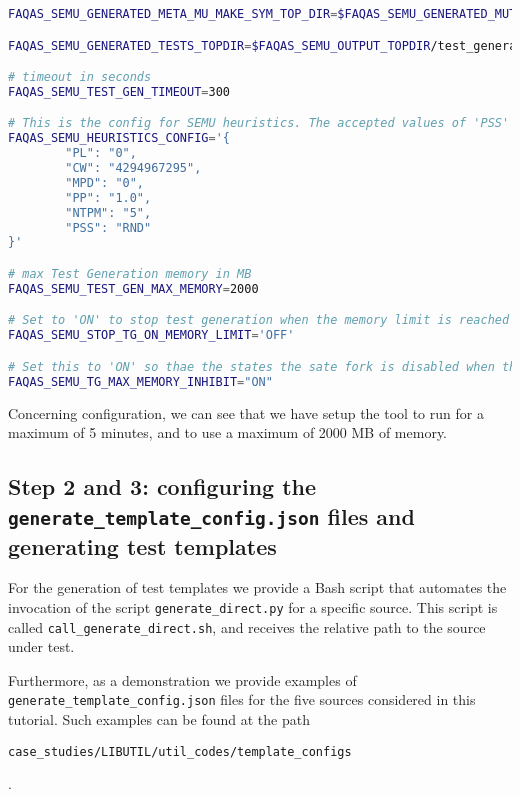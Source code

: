 \begin{lstlisting}[language=bash,label=listing:LIBUTIL:conf,caption=faqas\_semus\_conf.sh file for LIBUTIL case study.]
FAQAS_SEMU_GENERATED_META_MU_MAKE_SYM_TOP_DIR=$FAQAS_SEMU_GENERATED_MUTANTS_TOPDIR/"MakeSym-TestGen-Input"

FAQAS_SEMU_GENERATED_TESTS_TOPDIR=$FAQAS_SEMU_OUTPUT_TOPDIR/test_generation

# timeout in seconds
FAQAS_SEMU_TEST_GEN_TIMEOUT=300

# This is the config for SEMU heuristics. The accepted values of 'PSS' are 'RND' for random and 'MDO' for minimum distance to output
FAQAS_SEMU_HEURISTICS_CONFIG='{
        "PL": "0",
        "CW": "4294967295",
        "MPD": "0",
        "PP": "1.0",
        "NTPM": "5",
        "PSS": "RND"
}'

# max Test Generation memory in MB
FAQAS_SEMU_TEST_GEN_MAX_MEMORY=2000

# Set to 'ON' to stop test generation when the memory limit is reached
FAQAS_SEMU_STOP_TG_ON_MEMORY_LIMIT='OFF'

# Set this to 'ON' so thae the states the sate fork is disabled when the memory limit is reached, to avoid going much over it
FAQAS_SEMU_TG_MAX_MEMORY_INHIBIT="ON"
\end{lstlisting}

Concerning \SEMU configuration, we can see that we have setup the tool to run for a maximum of 5 minutes, and to use a maximum of 2000 MB of memory.

\subsection{Step 2 and 3: configuring the \texttt{generate\_template\_config.json} files and generating test templates}

For the generation of test templates we provide a Bash script that automates the invocation of the script \texttt{generate\_direct.py} for a specific source. This script is called \texttt{call\_generate\_direct.sh}, and receives the relative path to the source under test. 


Furthermore, as a demonstration we provide examples of \texttt{generate\_template\_config.json} files for the five sources considered in this tutorial. Such examples can be found at the path \begin{small}\texttt{case\_studies/LIBUTIL/util\_codes/template\_configs}\end{small}.

